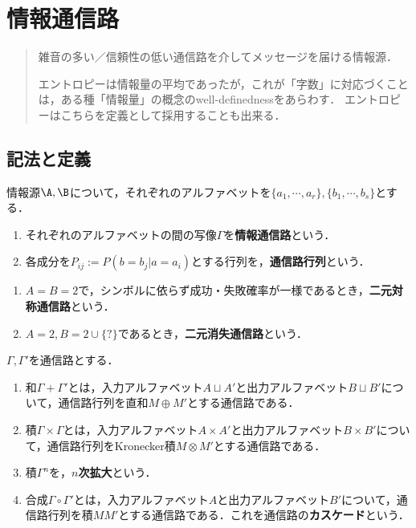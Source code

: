 \documentclass[uplatex,dvipdfmx]{jsreport}
\begin{document}
\chapter{情報通信路}

\begin{quotation}
    雑音の多い／信頼性の低い通信路を介してメッセージを届ける情報源．

    エントロピーは情報量の平均であったが，これが「字数」に対応づくことは，ある種「情報量」の概念のwell-definednessをあらわす．
    エントロピーはこちらを定義として採用することも出来る．
\end{quotation}

\section{記法と定義}

\begin{definition}[channel]
    情報源$\A,\B$について，それぞれのアルファベットを$\{a_1,\cdots,a_r\},\{b_1,\cdots,b_s\}$とする．
    \begin{enumerate}
        \item それぞれのアルファベットの間の写像$\Gamma$を\textbf{情報通信路}という．
        \item 各成分を$P_{ij}:=P(b=b_j|a=a_i)$とする行列を，\textbf{通信路行列}という．
    \end{enumerate}
\end{definition}
\begin{example}\mbox{}
    \begin{enumerate}
        \item $A=B=2$で，シンボルに依らず成功・失敗確率が一様であるとき，\textbf{二元対称通信路}という．
        \item $A=2,B=2\cup\{?\}$であるとき，\textbf{二元消失通信路}という．
    \end{enumerate}
\end{example}

\begin{definition}
    $\Gamma,\Gamma'$を通信路とする．
    \begin{enumerate}
        \item 和$\Gamma+\Gamma'$とは，入力アルファベット$A\sqcup A'$と出力アルファベット$B\sqcup B'$について，通信路行列を直和$M\oplus M'$とする通信路である．
        \item 積$\Gamma\times\Gamma$とは，入力アルファベット$A\times A'$と出力アルファベット$B\times B'$について，通信路行列をKronecker積$M\otimes M'$とする通信路である．
        \item 積$\Gamma^n$を，\textbf{$n$次拡大}という．
        \item 合成$\Gamma\circ\Gamma'$とは，入力アルファベット$A$と出力アルファベット$B'$について，通信路行列を積$MM'$とする通信路である．これを通信路の\textbf{カスケード}という．
    \end{enumerate}
\end{definition}
\end{document}
